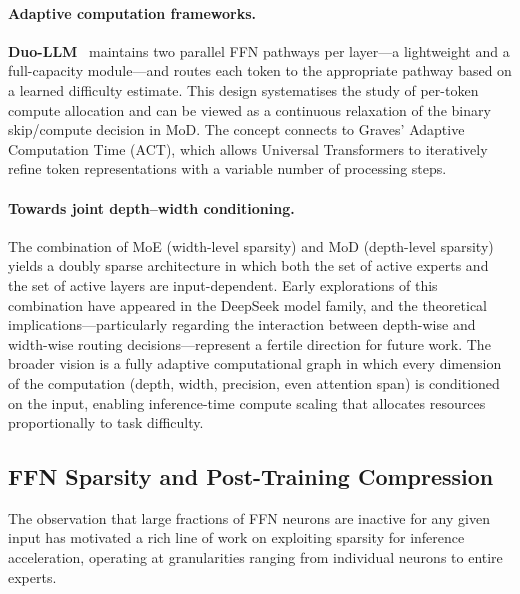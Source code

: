 \paragraph{Adaptive computation frameworks.}
\textbf{Duo-LLM}~\cite{duollm2024} maintains two parallel FFN pathways per layer---a lightweight and a full-capacity module---and routes each token to the appropriate pathway based on a learned difficulty estimate.
This design systematises the study of per-token compute allocation and can be viewed as a continuous relaxation of the binary skip/compute decision in MoD.
The concept connects to Graves' Adaptive Computation Time (ACT), which allows Universal Transformers to iteratively refine token representations with a variable number of processing steps.

\paragraph{Towards joint depth--width conditioning.}
The combination of MoE (width-level sparsity) and MoD (depth-level sparsity) yields a doubly sparse architecture in which both the set of active experts and the set of active layers are input-dependent.
Early explorations of this combination have appeared in the DeepSeek model family, and the theoretical implications---particularly regarding the interaction between depth-wise and width-wise routing decisions---represent a fertile direction for future work.
The broader vision is a fully adaptive computational graph in which every dimension of the computation (depth, width, precision, even attention span) is conditioned on the input, enabling inference-time compute scaling that allocates resources proportionally to task difficulty.


\subsection{FFN Sparsity and Post-Training Compression}
\label{subsec:ffn_sparsity}

The observation that large fractions of FFN neurons are inactive for any given input has motivated a rich line of work on exploiting sparsity for inference acceleration, operating at granularities ranging from individual neurons to entire experts.

